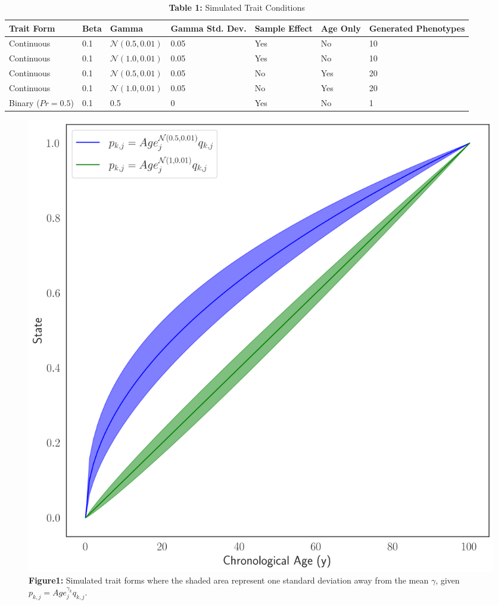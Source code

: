 \documentclass{article}
\begin{document}
{\begin{table}[H]
\caption*{\textbf{Table 1:} Simulated Trait Conditions}  
\begin{tabular}{| p{20mm} | p{15mm} | p{20mm} | p{20mm} | p{20mm} | p{20mm} | p{20mm} |}
\hline
\textbf{Trait Form}&\textbf{Beta}&\textbf{Gamma}&\textbf{Gamma Std. Dev.}&\textbf{Sample Effect}&
\textbf{Age Only}&\textbf{Generated Phenotypes}\\ \hline
Continuous&0.1&$\mathcal{N}(0.5, 0.01)$&0.05&Yes&No&10\\ \hline
Continuous&0.1&$\mathcal{N}(1.0, 0.01)$&0.05&Yes&No&10\\ \hline
Continuous&0.1&$\mathcal{N}(0.5, 0.01)$&0.05&No&Yes&20\\ \hline
Continuous&0.1&$\mathcal{N}(1.0, 0.01)$&0.05&No&Yes&20\\ \hline
Binary ($Pr=0.5$)&0.1&0.5&0&Yes&No&1\\ \hline
\end{tabular}
\end{table}

\begin{center}
    \begin{figure}
    \includegraphics[scale=.4]{Figures/Figure1.png}    
    \footnotesize
    \caption*{\small \textbf{Figure1:} Simulated trait forms where the shaded area represent one 
    standard deviation away from the mean $\gamma$, given $p_{k,j} = Age_j^{\gamma_{k}} q_{k,j}$.}
    \end{figure}
\end{center}

}
\end{document}
